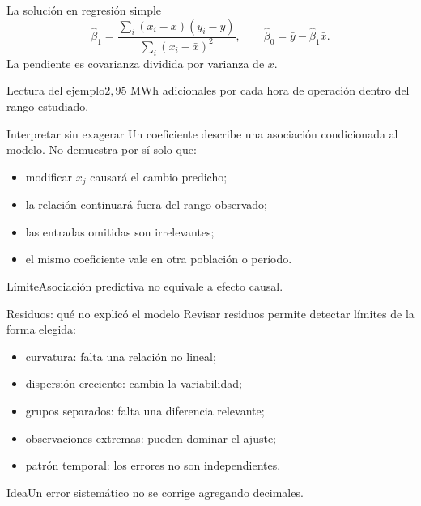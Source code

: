 \documentclass[aspectratio=169,10pt]{beamer}
\begin{document}
\begin{frame}{La solución en regresión simple}
  \small
  \[\widehat\beta_1=
  \frac{\sum_i(x_i-\bar x)(y_i-\bar y)}{\sum_i(x_i-\bar x)^2},
  \qquad \widehat\beta_0=\bar y-\widehat\beta_1\bar x.\]
  La pendiente es covarianza dividida por varianza de $x$.
  \begin{block}{Lectura del ejemplo}$2{,}95$ MWh adicionales por cada hora de operación dentro del rango estudiado.\end{block}
\end{frame}

\begin{frame}{Interpretar sin exagerar}
  \small
  Un coeficiente describe una asociación condicionada al modelo. No demuestra por sí solo que:
  \begin{itemize}
    \item modificar $x_j$ causará el cambio predicho;
    \item la relación continuará fuera del rango observado;
    \item las entradas omitidas son irrelevantes;
    \item el mismo coeficiente vale en otra población o período.
  \end{itemize}
  \begin{alertblock}{Límite}Asociación predictiva no equivale a efecto causal.\end{alertblock}
\end{frame}

\begin{frame}{Residuos: qué no explicó el modelo}
  \small
  Revisar residuos permite detectar límites de la forma elegida:
  \begin{itemize}
    \item curvatura: falta una relación no lineal;
    \item dispersión creciente: cambia la variabilidad;
    \item grupos separados: falta una diferencia relevante;
    \item observaciones extremas: pueden dominar el ajuste;
    \item patrón temporal: los errores no son independientes.
  \end{itemize}
  \begin{block}{Idea}Un error sistemático no se corrige agregando decimales.\end{block}
\end{frame}
\end{document}
